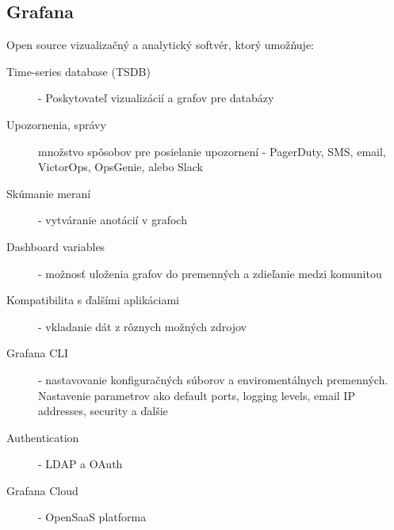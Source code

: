 \documentclass[../../main.tex]{subfiles}
\begin{document}
\subsection{Grafana}
    Open source vizualizačný a analytický  softvér, ktorý umožňuje: 
            \begin{description}
                \item [Time-series database (TSDB)] - Poskytovateľ vizualizácií a grafov pre databázy 
                \item [Upozornenia, správy] množstvo spôsobov pre posielanie upozornení - PagerDuty, SMS, email, VictorOps, OpsGenie, alebo Slack
                \item [Skúmanie meraní] - vytváranie anotácií v grafoch
                \item [Dashboard variables] - možnosť uloženia grafov do premenných a zdieľanie medzi komunitou
                \item [Kompatibilita s ďalšími aplikáciami] - vkladanie dát z rôznych možných zdrojov
                \item[Grafana CLI] - nastavovanie konfiguračných súborov a enviromentálnych premenných. Nastavenie parametrov ako default ports, logging levels, email IP addresses, security a ďalšie 
                \item[Authentication] - LDAP a OAuth
                \item[Grafana Cloud] - OpenSaaS platforma\cite{grafana}
            \end{description}
% 
\end{document}

